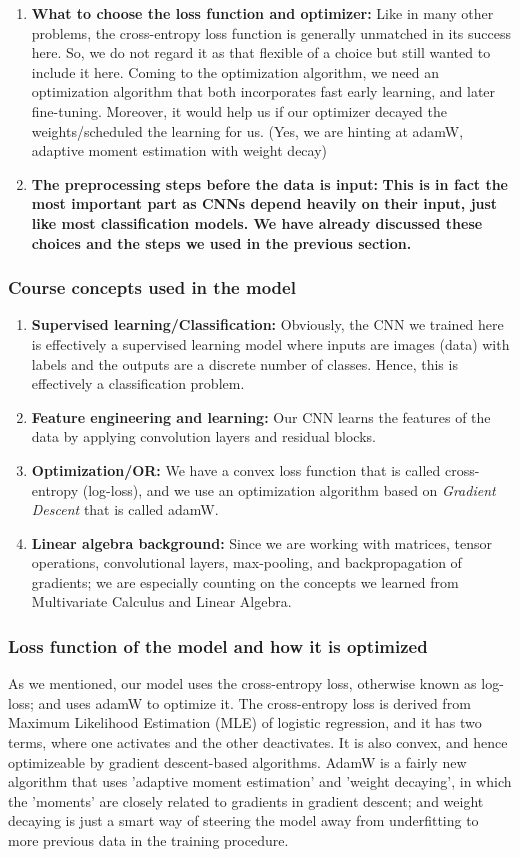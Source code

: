 \documentclass[10pt]{article} %
\begin{document}
\begin{enumerate}
    \item \textbf{What to choose the loss function and optimizer:} Like in many other problems, the cross-entropy loss function is generally unmatched in its success here. So, we do not regard it as that flexible of a choice but still wanted to include it here. Coming to the optimization algorithm, we need an optimization algorithm that both incorporates fast early learning, and later fine-tuning. Moreover, it would help us if our optimizer decayed the weights/scheduled the learning for us. (Yes, we are hinting at adamW, adaptive moment estimation with weight decay)
    \item \textbf{The preprocessing steps before the data is input:} \textbf{This is in fact the most important part as CNNs depend heavily on their input, just like most classification models. We have already discussed these choices and the steps we used in the previous section.}
\end{enumerate}

\subsubsection{Course concepts used in the model}\begin{enumerate}
    \item \textbf{Supervised learning/Classification:} Obviously, the CNN we trained here is effectively a supervised learning model where inputs are images (data) with labels and the outputs are a discrete number of classes. Hence, this is effectively a classification problem.
    \item \textbf{Feature engineering and learning:} Our CNN learns the features of the data by applying convolution layers and residual blocks.
    \item \textbf{Optimization/OR:} We have a convex loss function that is called cross-entropy (log-loss), and we use an optimization algorithm based on \textit{Gradient Descent} that is called adamW.
    \item \textbf{Linear algebra background:} Since we are working with matrices, tensor operations, convolutional layers, max-pooling, and backpropagation of gradients; we are especially counting on the concepts we learned from Multivariate Calculus and Linear Algebra.
\end{enumerate}
\subsubsection{Loss function of the model and how it is optimized}
    As we mentioned, our model uses the cross-entropy loss, otherwise known as log-loss; and uses adamW to optimize it. The cross-entropy loss is derived from Maximum Likelihood Estimation (MLE) of logistic regression, and it has two terms, where one activates and the other deactivates. It is also convex, and hence optimizeable by gradient descent-based algorithms. AdamW is a fairly new algorithm that uses 'adaptive moment estimation' and 'weight decaying', in which the 'moments' are closely related to gradients in gradient descent; and weight decaying is just a smart way of steering the model away from underfitting to more previous data in the training procedure.
\end{document}
